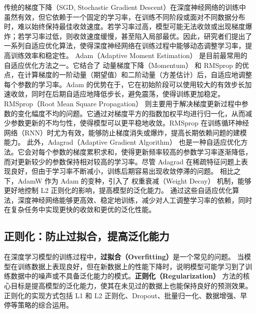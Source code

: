 传统的梯度下降（SGD, Stochastic Gradient Descent）在深度神经网络的训练中虽然有效，但它依赖于一个固定的学习率，在训练不同阶段或面对不同数据分布时，难以始终保持最佳收敛速度。若学习率过高，模型可能无法收敛或出现梯度爆炸；若学习率过低，则收敛速度缓慢，甚至陷入局部最优。因此，研究者们提出了一系列自适应优化算法，使得深度神经网络在训练过程中能够动态调整学习率，提高训练效率和稳定性。
Adam（Adaptive Moment Estimation） 是目前最常用的自适应优化方法之一。它结合了 动量梯度下降（Momentum） 和 RMSprop 的优点，在计算梯度的一阶动量（期望值）和二阶动量（方差估计）后，自适应地调整每个参数的学习率。Adam 的优势在于，它在初始阶段可以使用较大的有效步长加速收敛，同时在后期自适应地降低步长，避免震荡，使得训练更加稳定。
RMSprop（Root Mean Square Propagation） 则主要用于解决梯度更新过程中参数的变化幅度不均的问题。它通过对梯度平方的指数加权平均进行归一化，从而减少参数更新的不均匀性，使得模型可以更平稳地收敛。RMSprop 在训练循环神经网络（RNN）时尤为有效，能够防止梯度消失或爆炸，提高长期依赖问题的建模能力。
此外，Adagrad（Adaptive Gradient Algorithm） 也是一种自适应优化方法。它会对每个参数的梯度累积求和，使得更新频率较高的参数学习率逐渐降低，而对更新较少的参数保持相对较高的学习率。尽管 Adagrad 在稀疏特征问题上表现良好，但由于学习率不断减小，训练后期容易出现收敛停滞的问题。
相比之下，AdamW 作为 Adam 的变种，引入了 权重衰减（Weight Decay） 机制，能够更好地控制 L2 正则化的影响，提高模型的泛化能力。
通过这些自适应优化算法，深度神经网络能够更高效、稳定地训练，减少对人工调整学习率的依赖，同时在复杂任务中实现更快的收敛和更优的泛化性能。


\subsection{正则化：防止过拟合，提高泛化能力}


在深度学习模型的训练过程中，{\bf 过拟合（Overfitting）}是一个常见的问题。
当模型在训练数据上表现良好，但在新数据上的性能下降时，说明模型可能学习到了训练数据中的噪声或不具备泛化能力的模式。{\bf 正则化（Regularization）} 方法的核心目标是提高模型的泛化能力，使其在未见过的数据上也能保持良好的预测效果。
正则化的实现方式包括 L1 和 L2 正则化、Dropout、批量归一化、数据增强、早停等策略的综合运用。
